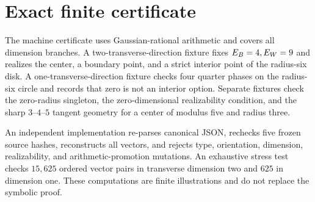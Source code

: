 \section{Exact finite certificate}

The machine certificate uses Gaussian-rational arithmetic and covers all
dimension branches.  A two-transverse-direction fixture fixes
$E_B=4,E_W=9$ and realizes the center, a boundary point, and a strict interior
point of the radius-six disk.  A one-transverse-direction fixture checks four
quarter phases on the radius-six circle and records that zero is not an
interior option.  Separate fixtures check the zero-radius singleton, the
zero-dimensional realizability condition, and the sharp $3$--$4$--$5$ tangent
geometry for a center of modulus five and radius three.

An independent implementation re-parses canonical JSON, rechecks five frozen
source hashes, reconstructs all vectors, and rejects type, orientation,
dimension, realizability, and arithmetic-promotion mutations.  An exhaustive
stress test checks $15{,}625$ ordered vector pairs in transverse dimension two
and $625$ in dimension one.  These computations are finite illustrations and
do not replace the symbolic proof.
